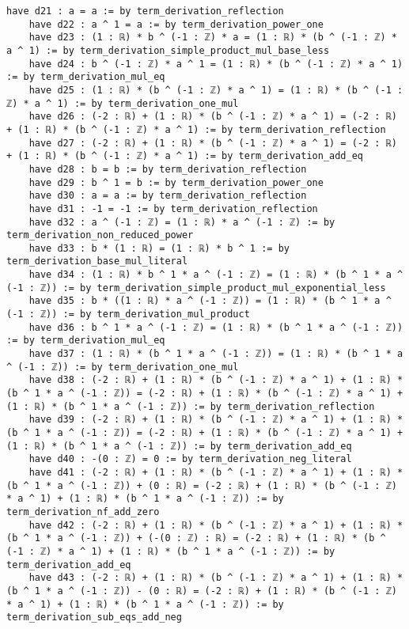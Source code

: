\documentclass{article}
\begin{document}
\begin{tcolorbox}[colback=white!10, width=\linewidth]
\begin{lstlisting}[language=Lean4]
    have d21 : a = a := by term_derivation_reflection
    have d22 : a ^ 1 = a := by term_derivation_power_one
    have d23 : (1 : ℝ) * b ^ (-1 : ℤ) * a = (1 : ℝ) * (b ^ (-1 : ℤ) * a ^ 1) := by term_derivation_simple_product_mul_base_less
    have d24 : b ^ (-1 : ℤ) * a ^ 1 = (1 : ℝ) * (b ^ (-1 : ℤ) * a ^ 1) := by term_derivation_mul_eq
    have d25 : (1 : ℝ) * (b ^ (-1 : ℤ) * a ^ 1) = (1 : ℝ) * (b ^ (-1 : ℤ) * a ^ 1) := by term_derivation_one_mul
    have d26 : (-2 : ℝ) + (1 : ℝ) * (b ^ (-1 : ℤ) * a ^ 1) = (-2 : ℝ) + (1 : ℝ) * (b ^ (-1 : ℤ) * a ^ 1) := by term_derivation_reflection
    have d27 : (-2 : ℝ) + (1 : ℝ) * (b ^ (-1 : ℤ) * a ^ 1) = (-2 : ℝ) + (1 : ℝ) * (b ^ (-1 : ℤ) * a ^ 1) := by term_derivation_add_eq
    have d28 : b = b := by term_derivation_reflection
    have d29 : b ^ 1 = b := by term_derivation_power_one
    have d30 : a = a := by term_derivation_reflection
    have d31 : -1 = -1 := by term_derivation_reflection
    have d32 : a ^ (-1 : ℤ) = (1 : ℝ) * a ^ (-1 : ℤ) := by term_derivation_non_reduced_power
    have d33 : b * (1 : ℝ) = (1 : ℝ) * b ^ 1 := by term_derivation_base_mul_literal
    have d34 : (1 : ℝ) * b ^ 1 * a ^ (-1 : ℤ) = (1 : ℝ) * (b ^ 1 * a ^ (-1 : ℤ)) := by term_derivation_simple_product_mul_exponential_less
    have d35 : b * ((1 : ℝ) * a ^ (-1 : ℤ)) = (1 : ℝ) * (b ^ 1 * a ^ (-1 : ℤ)) := by term_derivation_mul_product
    have d36 : b ^ 1 * a ^ (-1 : ℤ) = (1 : ℝ) * (b ^ 1 * a ^ (-1 : ℤ)) := by term_derivation_mul_eq
    have d37 : (1 : ℝ) * (b ^ 1 * a ^ (-1 : ℤ)) = (1 : ℝ) * (b ^ 1 * a ^ (-1 : ℤ)) := by term_derivation_one_mul
    have d38 : (-2 : ℝ) + (1 : ℝ) * (b ^ (-1 : ℤ) * a ^ 1) + (1 : ℝ) * (b ^ 1 * a ^ (-1 : ℤ)) = (-2 : ℝ) + (1 : ℝ) * (b ^ (-1 : ℤ) * a ^ 1) + (1 : ℝ) * (b ^ 1 * a ^ (-1 : ℤ)) := by term_derivation_reflection
    have d39 : (-2 : ℝ) + (1 : ℝ) * (b ^ (-1 : ℤ) * a ^ 1) + (1 : ℝ) * (b ^ 1 * a ^ (-1 : ℤ)) = (-2 : ℝ) + (1 : ℝ) * (b ^ (-1 : ℤ) * a ^ 1) + (1 : ℝ) * (b ^ 1 * a ^ (-1 : ℤ)) := by term_derivation_add_eq
    have d40 : -(0 : ℤ) = 0 := by term_derivation_neg_literal
    have d41 : (-2 : ℝ) + (1 : ℝ) * (b ^ (-1 : ℤ) * a ^ 1) + (1 : ℝ) * (b ^ 1 * a ^ (-1 : ℤ)) + (0 : ℝ) = (-2 : ℝ) + (1 : ℝ) * (b ^ (-1 : ℤ) * a ^ 1) + (1 : ℝ) * (b ^ 1 * a ^ (-1 : ℤ)) := by term_derivation_nf_add_zero
    have d42 : (-2 : ℝ) + (1 : ℝ) * (b ^ (-1 : ℤ) * a ^ 1) + (1 : ℝ) * (b ^ 1 * a ^ (-1 : ℤ)) + (-(0 : ℤ) : ℝ) = (-2 : ℝ) + (1 : ℝ) * (b ^ (-1 : ℤ) * a ^ 1) + (1 : ℝ) * (b ^ 1 * a ^ (-1 : ℤ)) := by term_derivation_add_eq
    have d43 : (-2 : ℝ) + (1 : ℝ) * (b ^ (-1 : ℤ) * a ^ 1) + (1 : ℝ) * (b ^ 1 * a ^ (-1 : ℤ)) - (0 : ℝ) = (-2 : ℝ) + (1 : ℝ) * (b ^ (-1 : ℤ) * a ^ 1) + (1 : ℝ) * (b ^ 1 * a ^ (-1 : ℤ)) := by term_derivation_sub_eqs_add_neg

\end{lstlisting}
\end{tcolorbox}
\end{document}

